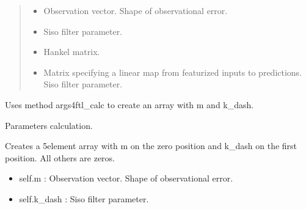 \documentclass[letterpaper,10pt,english]{sphinxmanual}
\begin{document}
\begin{fulllineitems}
\begin{quote}
\begin{description}
\begin{itemize}
\item {} 
\sphinxAtStartPar
{} \textendash{} Observation vector. Shape of observational error.

\item {} 
\sphinxAtStartPar
{} \textendash{} Siso filter parameter.

\item {} 
\sphinxAtStartPar
{} \textendash{} Hankel matrix.

\item {} 
\sphinxAtStartPar
{} \textendash{} Matrix specifying a linear map from featurized inputs to predictions.
Siso filter parameter.

\end{itemize}

\end{description}\end{quote}

\sphinxAtStartPar
Uses method args4ftl\_calc to create an array with m and k\_dash.

\begin{fulllineitems}
\label{\detokenize{LDS.LDS.filters:LDS.LDS.filters.wave_filtering_siso_ftl_persistent.WaveFilteringSisoFtlPersistent.args4ftl_calc}}
\sphinxAtStartPar
Parameters calculation.

\sphinxAtStartPar
Creates a 5\sphinxhyphen{}element array with m
on the zero position and k\_dash on the first position.
All others are zeros.
\begin{itemize}
\item {} 
\sphinxAtStartPar
self.m      : Observation vector. Shape of observational error.

\item {} 
\sphinxAtStartPar
self.k\_dash : Siso filter parameter.

\end{itemize}

\end{fulllineitems}



\end{fulllineitems}
\end{document}
